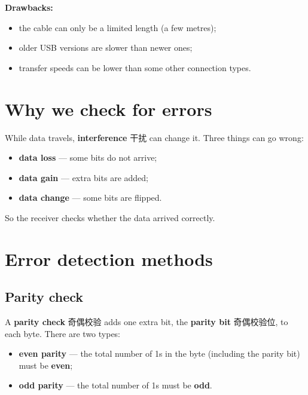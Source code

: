 \documentclass[11pt]{article}
\begin{document}
\textbf{Drawbacks:}

\begin{itemize}
\item the cable can only be a limited length (a few metres);

\item older USB versions are slower than newer ones;

\item transfer speeds can be lower than some other connection types.

\end{itemize}

\section*{Why we check for errors}

While data travels, \textbf{interference} 干扰 can change it. Three things can go wrong:

\begin{itemize}
\item \textbf{data loss} — some bits do not arrive;

\item \textbf{data gain} — extra bits are added;

\item \textbf{data change} — some bits are flipped.

\end{itemize}

So the receiver checks whether the data arrived correctly.

\section*{Error detection methods}

\subsection*{Parity check}

A \textbf{parity check} 奇偶校验 adds one extra bit, the \textbf{parity bit} 奇偶校验位, to each byte. There are two types:

\begin{itemize}
\item \textbf{even parity} — the total number of 1s in the byte (including the parity bit) must be \textbf{even};

\item \textbf{odd parity} — the total number of 1s must be \textbf{odd}.

\end{itemize}
\end{document}
